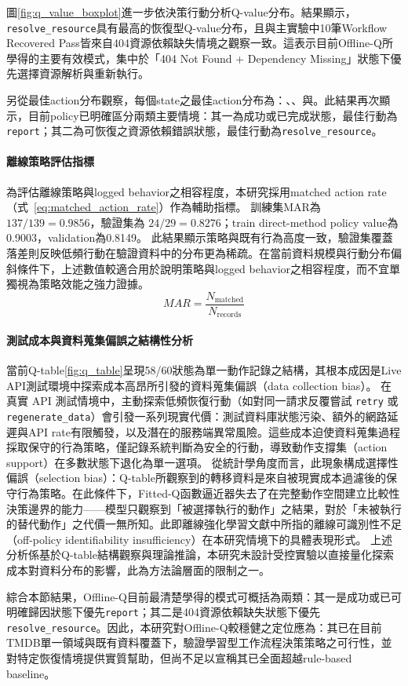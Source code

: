 \begin{ZhChapter}
\text 圖\ref{fig:q_value_boxplot}進一步依決策行動分析Q-value分布。結果顯示，\texttt{resolve\_resource}具有最高的恢復型Q-value分布，且與主實驗中10筆Workflow Recovered Pass皆來自404資源依賴缺失情境之觀察一致。這表示目前Offline-Q所學得的主要有效模式，集中於「404 Not Found + Dependency Missing」狀態下優先選擇資源解析與重新執行。

\text 另從最佳action分布觀察，每個state之最佳action分布為：、、與。此結果再次顯示，目前policy已明確區分兩類主要情境：其一為成功或已完成狀態，最佳行動為\texttt{report}；其二為可恢復之資源依賴錯誤狀態，最佳行動為\texttt{resolve\_resource}。

\paragraph{離線策略評估指標}
\text 為評估離線策略與logged behavior之相容程度，本研究採用matched action rate（式~\eqref{eq:matched_action_rate}）作為輔助指標。 訓練集MAR為 $137/139 = 0.9856$，驗證集為 $24/29 = 0.8276$；train direct-method policy value為0.9003，validation為0.8149。
\text 此結果顯示策略與既有行為高度一致，驗證集覆蓋落差則反映低頻行動在驗證資料中的分布更為稀疏。在當前資料規模與行動分布偏斜條件下，上述數值較適合用於說明策略與logged behavior之相容程度，而不宜單獨視為策略效能之強力證據。
\begin{equation}
\label{eq:matched_action_rate}
MAR=
\frac{N_{\mathrm{matched}}}
{N_{\mathrm{records}}}
\end{equation}

\paragraph{測試成本與資料蒐集偏誤之結構性分析}
\text 當前Q-table\ref{fig:q_table}呈現58/60狀態為單一動作記錄之結構，其根本成因是Live API測試環境中探索成本高昂所引發的資料蒐集偏誤（data collection bias）。
\text 在真實 API 測試情境中，主動探索低頻恢復行動（如對同一請求反覆嘗試 \texttt{retry} 或 \texttt{regenerate\_data}）會引發一系列現實代價：測試資料庫狀態污染、額外的網路延遲與API rate有限觸發，以及潛在的服務端異常風險。這些成本迫使資料蒐集過程採取保守的行為策略，僅記錄系統判斷為安全的行動，導致動作支撐集（action support）在多數狀態下退化為單一選項。
\text 從統計學角度而言，此現象構成選擇性偏誤（selection bias）：Q-table所觀察到的轉移資料是來自被現實成本過濾後的保守行為策略。在此條件下，Fitted-Q函數逼近器失去了在完整動作空間建立比較性決策邊界的能力——模型只觀察到「被選擇執行的動作」之結果，對於「未被執行的替代動作」之代價一無所知。此即離線強化學習文獻中所指的離線可識別性不足（off-policy identifiability insufficiency）在本研究情境下的具體表現形式。
\text 上述分析係基於Q-table結構觀察與理論推論，本研究未設計受控實驗以直接量化探索成本對資料分布的影響，此為方法論層面的限制之一。

\text 綜合本節結果，Offline-Q目前最清楚學得的模式可概括為兩類：其一是成功或已可明確歸因狀態下優先\texttt{report}；其二是404資源依賴缺失狀態下優先\texttt{resolve\_resource}。因此，本研究對Offline-Q較穩健之定位應為：其已在目前TMDB單一領域與既有資料覆蓋下，驗證學習型工作流程決策策略之可行性，並對特定恢復情境提供實質幫助，但尚不足以宣稱其已全面超越rule-based baseline。
\end{ZhChapter}
